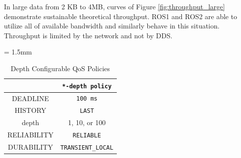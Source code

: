 \documentclass{sig-alternate-05-2015}
\begin{document}
In large data from 2 KB to 4MB, curves of Figure \ref{fig:throughput_large} demonstrate sustainable theoretical throughput.
ROS1 and ROS2 are able to utilize all of available bandwidth and similarly behave in this situation.
Throughput is limited by the network and not by DDS.

\renewcommand{\arraystretch}{1.0}
\begin{table}[t]
  \caption{\label{tb:depth_qos}Depth Configurable QoS Policies}
  \centering
  \tabcolsep = 1.5mm              %
  \begin{tabular}{c|c}
    \hline
    & \textbf{\texttt{*-depth policy} }\\
    \hline
    \hline
    DEADLINE & \texttt{100 ms}\\
    HISTORY & \texttt{LAST}\\
    depth & 1, 10, or 100\\
    RELIABILITY & \texttt{RELIABLE}\\
    DURABILITY & \texttt{TRANSIENT\_LOCAL}\\
    \hline
  \end{tabular}
  \vspace{-5mm}
\end{table}
\end{document}
